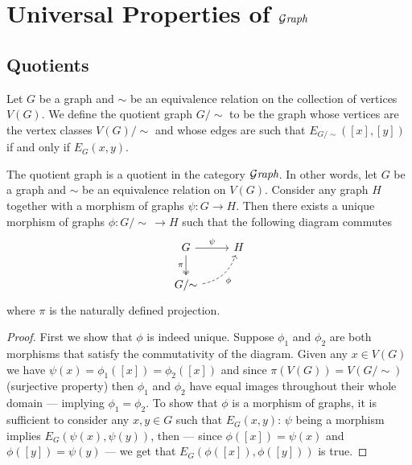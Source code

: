 \section{Universal Properties of \texorpdfstring{\({\mathcal{G}\textit{raph}}\)}{Graph}}

\subsection{Quotients}

\begin{definition}[Quotient]\label{def: quotient-graph}
  Let \(G\) be a graph and \(\sim\) be an equivalence relation on the collection
  of vertices \(V(G)\). We define the quotient graph \(G/{\sim}\) to be the graph
  whose vertices are the vertex classes \(V(G)/{\sim}\) and whose edges are
  such that \(E_{G/{\sim}}([x], [y])\) if and only if \(E_G(x, y)\).
\end{definition}

\begin{proposition}
  \label{prop: quotient-graph}
  The quotient graph is a quotient in the category \({\mathcal{G}\textit{raph}}\). In other words,
  let \(G\) be a graph and \(\sim\) be an equivalence relation on \(V(G)\).
  Consider any graph \(H\) together with a morphism of graphs \(\psi: G \to H\).
  Then there exists a unique morphism of graphs \(\phi: G/{\sim}\, \to H\) such
  that the following diagram commutes
  \[
    \begin{tikzcd}
      G \ar[d, two heads, swap, "\pi"] \ar[r, "\psi"] &H \\
      G/{\sim} \ar[ur, swap, bend right, dashed, "\phi"] &
    \end{tikzcd}
  \]
  where \(\pi\) is the naturally defined projection.
\end{proposition}

\begin{proof}
  First we show that \(\phi\) is indeed unique. Suppose \(\phi_1\) and
  \(\phi_2\) are both morphisms that satisfy the commutativity of the diagram.
  Given any \(x \in V(G)\) we have \(\psi(x) = \phi_1([x]) = \phi_2([x])\) and
  since \(\pi(V(G)) = V(G/{\sim})\) (surjective property) then \(\phi_1\) and
  \(\phi_2\) have equal images throughout their whole domain --- implying
  \(\phi_1 = \phi_2\). To show that \(\phi\) is a morphism of graphs, it is
  sufficient to consider any \(x, y \in G\) such that \(E_G(x, y)\): \(\psi\)
  being a morphism implies \(E_G(\psi(x), \psi(y))\), then --- since \(\phi([x])
  = \psi(x)\) and \(\phi([y]) = \psi(y)\) --- we get that \(E_G(\phi([x]),
  \phi([y]))\) is true.
\end{proof}


